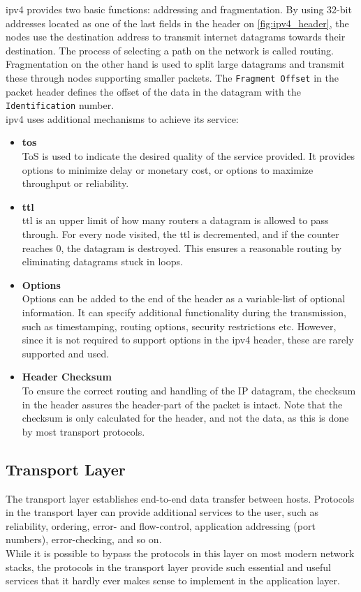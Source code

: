 \gls{ipv4} provides two basic functions: addressing and fragmentation. By using
32-bit addresses located as one of the last fields in the header on
\autoref{fig:ipv4_header}, the nodes use the destination address to transmit
internet datagrams towards their destination. The process of selecting a path
on the network is called routing\cite{RFC0791}.\\
Fragmentation on the other hand is used to split large datagrams and transmit
these through nodes supporting smaller packets. The \texttt{Fragment Offset} in
the packet header defines the offset of the data in the datagram with the
\texttt{Identification} number.\\
\gls{ipv4} uses additional mechanisms to achieve its service:
\begin{itemize}
	\item \textbf{\gls{tos}}\\
	ToS is used to indicate the desired quality of the service provided.
	It provides options to minimize delay or monetary cost, or options to
		maximize throughput or
		reliability\cite{tcpip_illustrated_vol1}\cite{RFC0791}.
	\item \textbf{\gls{ttl}}\\
	\gls{ttl} is an upper limit of how many routers a datagram is allowed
		to pass through. For every node visited, the \gls{ttl} is decremented,
		and if the counter reaches $0$, the datagram is destroyed. This
		ensures a reasonable routing by eliminating datagrams stuck in
		loops\cite{RFC0791}.
	\item \textbf{Options}\\
	Options can be added to the end of the header as a variable-list of
		optional information. It can specify additional functionality
		during the transmission, such as timestamping, routing options,
		security restrictions etc. However, since it is not required
		to support options in the \gls{ipv4} header, these are rarely
		supported and used\cite{tcpip_illustrated_vol1}.
	\item \textbf{Header Checksum}\\
	To ensure the correct routing and handling of the IP datagram, the
		checksum in the header assures the header-part of the packet is
		intact. Note that the checksum is only calculated for the
		header, and not the data, as this is done by most transport
		protocols.
\end{itemize}


\subsection{Transport Layer}
The transport layer establishes end-to-end data transfer between hosts.
Protocols in the transport layer can provide additional services to the user,
such as reliability, ordering, error- and flow-control, application addressing
(port numbers), error-checking, and so on.\\
While it is possible to bypass the protocols in this layer on most modern
network stacks, the protocols in the transport layer provide such essential
and useful services that it hardly ever makes sense to implement in the
application layer.


